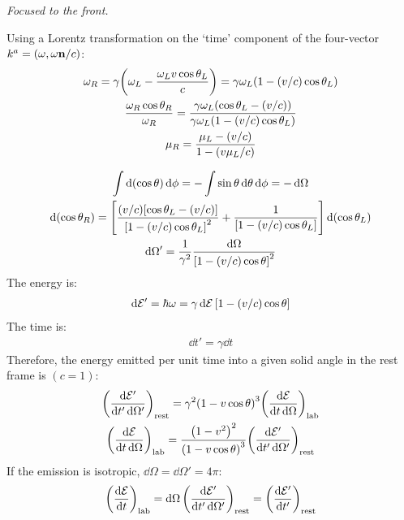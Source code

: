 \documentclass{report}
\begin{document}
\begin{subquests}
	\item \emph{Focused to the front.}
	\begin{subquests}
		\item
		Using a Lorentz transformation on the `time' component of the four-vector $k^a = (\omega,\omega{\bf n}/c)$:
		\begin{gather*}
			\omega_R = \gamma\pqty{\omega_L - \frac{\omega_Lv\cos\theta_L}{c}} = \gamma\omega_L\pqty{1-(v/c)\cos\theta_L} \\
			\frac{\omega_R \cos\theta_R}{\omega_R} = \frac{\gamma\omega_L\pqty{\cos\theta_L   - (v/c)}}{\gamma\omega_L\pqty{1-(v/c)\cos\theta_L}} \\
			\mu_R = \frac{\mu_L- (v/c)}{1-(v\mu_L/c)}
		\end{gather*}

		\item

		\item
		\begin{gather*}
			\int\dd(\cos\theta)\dd{\phi} = -\int\sin\theta\dd{\theta}\dd{\phi} = -\dd{\Omega} \\
			\dd(\cos\theta_R) = \bqty{\frac{(v/c)\bqty{\cos\theta_L - (v/c)}}{\bqty{1-(v/c)\cos\theta_L}^2} + \frac{1}{\bqty{1-(v/c)\cos\theta_L}}}\dd(\cos\theta_L) \\
			\dd{\Omega'} = \frac{1}{\gamma^2}\frac{\dd{\Omega}}{\bqty{1-(v/c)\cos\theta}^2}
		\end{gather*}
		The energy is:
		\begin{gather*}
			\dd{\mathcal E'} = \hbar \omega = \gamma \dd{\mathcal E}\bqty{1-(v/c)\cos \theta} 
		\end{gather*}
		The time is:
		\begin{gather*}
			\dd{t'} = \gamma \dd{t}
		\end{gather*}
		Therefore, the energy emitted per unit time into a given solid angle in the rest frame is $(c=1)$:
		\begin{gather*}
			\pqty{\frac{\dd{\mathcal E'}}{\dd{t'}{\dd\Omega'}}}_{\mathrm{rest}} = \gamma^2\pqty{1-v\cos\theta}^3\pqty{\frac{\dd{\mathcal E}}{\dd{t}\dd{\Omega}}}_{\mathrm{lab}} \\
			\pqty{\frac{\dd{\mathcal E}}{\dd{t}\dd{\Omega}}}_{\mathrm{lab}} = \frac{\pqty{1-v^2}^2}{\pqty{1-v\cos\theta}^3}\pqty{\frac{\dd{\mathcal E'}}{\dd{t'}{\dd\Omega'}}}_{\mathrm{rest}}
		\end{gather*}
		If the emission is isotropic, $\dd{\Omega} = \dd{\Omega'} = 4\pi$:
		\begin{gather*}
			\pqty{\dv{\mathcal E}{t}}_{\mathrm{lab}} = \dd{\Omega}\pqty{\frac{\dd{\mathcal E'}}{\dd{t'}{\dd\Omega'}}}_{\mathrm{rest}} = \pqty{\dv{\mathcal E'}{t'}}_{\mathrm{rest}}
		\end{gather*}
	\end{subquests}


\end{subquests}
\end{document}
